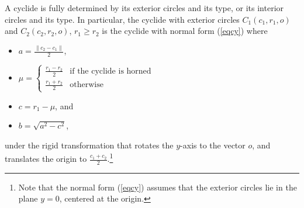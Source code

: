 \begin{lemma}
\label{lem:uni}
A cyclide is fully determined by its exterior circles and its type,
or its interior circles and its type.
In particular, the cyclide with exterior circles $C_1(c_1,r_1,o)$
and $C_2(c_2,r_2,o)$, $r_1 \geq r_2$
is the cyclide with normal form (\ref{eqcy}) where
\begin{itemize}
\item
	$a = \frac{\|c_2 - c_1\|}{2}$, 
\item
	$\mu = \left\{ \begin{array}{ll}
		\frac{r_1 - r_2}{2} &	\mbox{if the cyclide is horned} \\
		\frac{r_1 + r_2}{2} &	\mbox{otherwise}
	\end{array}
	\right. $
\item
	$c = r_1 - \mu$, and 
\item
	$b = \sqrt{a^2 - c^2}$,
\end{itemize}
under the rigid transformation
that rotates the $y$-axis to the
vector $o$, and translates the origin to $\frac{c_1 + c_2}{2}$.\footnote{Note 
	that the normal form 
	(\ref{eqcy}) assumes that the exterior circles
	lie in the plane $y=0$, centered at the origin.}


\end{lemma}
